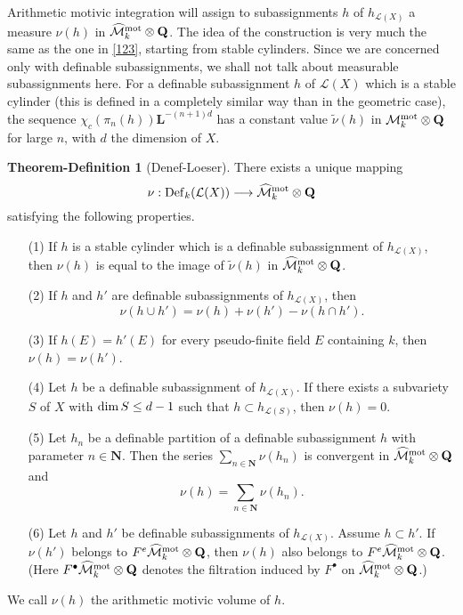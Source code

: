 \documentclass[english,12pt]{amsart}
\def\LL{{\mathbf L}}
\def\NN{{\mathbf N}}
\def\QQ{{\mathbf Q}}
\def\cL{{\mathcal L}}
\def\cM{{\mathcal M}}
\theoremstyle{definition}
\newtheorem{def-theorem}[subsubsection]{Theorem-Definition}
\theoremstyle{remark}
\theoremstyle{plain}
\numberwithin{equation}{subsection}
\def\LL{{\mathbf L}}
\def\NN{{\mathbf N}}
\def\QQ{{\mathbf Q}}
\def\cL{{\mathcal L}}
\def\cM{{\mathcal M}}
\begin{document}
Arithmetic motivic integration will assign to subassignments $h$ of $h_{\cL (X)}$
a measure $\nu (h)$ in $\widehat \cM^{\rm mot}_k \otimes \QQ$.
The idea of the construction is very much the same as the one in \ref{123},
starting from stable cylinders. 
Since we are concerned only with definable subassignments, we
shall not talk about  measurable subassignments here.
For a definable subassignment $h$ of $\cL (X)$ which is a stable cylinder
(this is defined 
in a completely similar way 
than in the geometric case), 
the sequence $\chi_c (\pi_n (h)) \LL^{- (n+ 1) d}$
has a  constant value $\tilde \nu (h)$ in
$\cM^{\rm mot}_k \otimes \QQ$ for large $n$, with $d$ the dimension of $X$.




\begin{def-theorem}[Denef-Loeser]\label{ami}There exists a unique
mapping
$$\nu : {\rm Def}_{k} (\cL (X))
\longrightarrow
\widehat \cM^{\rm mot}_k \otimes \QQ$$
satisfying the following properties.
\begin{enumerate}
\item[(1)]If  $h$ is a stable cylinder which is a definable subassignment of $h_{\cL (X)}$,
then
$\nu (h)$
is equal to the image
of
$\tilde \nu (h)$ in $\widehat \cM^{\rm mot}_k \otimes \QQ$.
\item[(2)]If $h$ and $h'$ are definable subassignments of $h_{\cL (X)}$, then
$$\nu (h \cup h') =
 \nu (h) +  \nu (h') -
 \nu (h \cap h').
$$
\item[(3)]If $h (E) = h' (E)$ for every pseudo-finite field $E$
containing $k$,
then $ \nu (h) =   \nu (h')$.
\item[(4)]Let  $h$ be a definable subassignment of $h_{\cL (X)}$.
If there exists a subvariety $S$ of $X$ with ${\rm dim} \, S \leq d - 1$
such that $h \subset h_{\cL (S)}$, then
$\nu (h) = 0$.
\item[(5)]Let $h_{n}$ be a definable partition of a definable subassignment
$h$
with parameter $n \in \NN$.
Then the series $\sum_{n \in \NN} \nu (h_{n})$
is convergent in
$\widehat \cM^{\rm mot}_k \otimes \QQ$
and 
$$
\nu (h) = \sum_{n \in \NN} \nu (h_{n}).
$$
\item[(6)]Let  $h$ and $h'$ be definable subassignments of $h_{\cL (X)}$.
Assume
$h \subset h'$.
If $ \nu (h') $ belongs to $F^{e} \widehat \cM^{\rm mot}_k \otimes \QQ$, then $\nu (h)$
also belongs to $F^{e} \widehat \cM^{\rm mot}_k \otimes \QQ$.
(Here $F^{\bullet} \widehat \cM^{\rm mot}_k \otimes \QQ$ denotes the filtration induced
by $F^{\bullet}$ on $ \widehat \cM^{\rm mot}_k \otimes \QQ$.)
\end{enumerate}
We call $\nu (h)$ the arithmetic motivic volume
of $h$.
\end{def-theorem}
\end{document}
